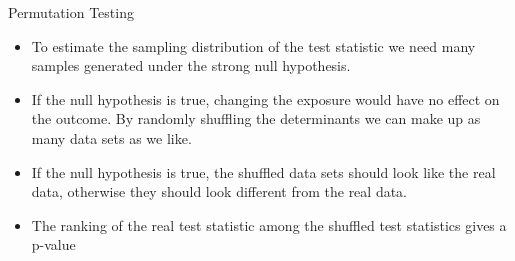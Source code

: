 \documentclass[10pt,handout]{beamer}\usepackage[]{graphicx}\usepackage[]{color}
\begin{document}
\begin{frame}{Permutation Testing}
	\begin{itemize}
		\item To estimate the sampling distribution of the test statistic we
		need many samples generated under the strong null hypothesis.
		\item If the null hypothesis is true, changing the exposure would have
		no effect on the outcome. By randomly shuffling the determinants
		we can make up as many data sets as we like.
		\item If the null hypothesis is true, the shuffled data sets should look
		like the real data, otherwise they should look different from the real data.
		\item The ranking of the real test statistic among the shuffled test
		statistics gives a p-value
	\end{itemize}
\end{frame}
\end{document}
